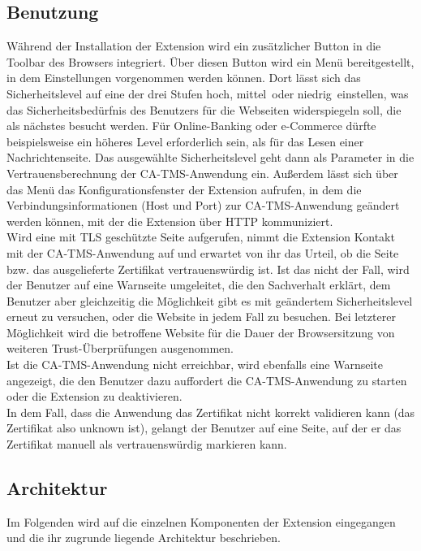 \documentclass[accentcolor=tud1c,article,colorback,11pt]{tudreport}
\begin{document}
\subsection{Benutzung}
Während der Installation der Extension wird ein zusätzlicher Button in die Toolbar des Browsers integriert. Über diesen Button wird ein Menü bereitgestellt, in dem Einstellungen vorgenommen werden können. Dort lässt sich das Sicherheitslevel auf eine der drei Stufen \glqq hoch\grqq, \glqq mittel\grqq ~oder \glqq niedrig\grqq ~einstellen, was das Sicherheitsbedürfnis des Benutzers für die Webseiten widerspiegeln soll, die als nächstes besucht werden. Für Online-Banking oder e-Commerce dürfte beispielsweise ein höheres Level erforderlich sein, als für das Lesen einer Nachrichtenseite. Das ausgewählte Sicherheitslevel geht dann als Parameter in die Vertrauensberechnung der CA-TMS-Anwendung ein. Außerdem lässt sich über das Menü das Konfigurationsfenster der Extension aufrufen, in dem die Verbindungsinformationen (Host und Port) zur CA-TMS-Anwendung geändert werden können, mit der die Extension über HTTP kommuniziert.\\
Wird eine mit TLS geschützte Seite aufgerufen, nimmt die Extension Kontakt mit der CA-TMS-Anwendung auf und erwartet von ihr das Urteil, ob die Seite bzw. das ausgelieferte Zertifikat vertrauenswürdig ist. Ist das nicht der Fall, wird der Benutzer auf eine Warnseite umgeleitet, die den Sachverhalt erklärt, dem Benutzer aber gleichzeitig die Möglichkeit gibt es mit geändertem Sicherheitslevel erneut zu versuchen, oder die Website in jedem Fall zu besuchen. Bei letzterer Möglichkeit wird die betroffene Website für die Dauer der Browsersitzung von weiteren Trust-Überprüfungen ausgenommen.\\
Ist die CA-TMS-Anwendung nicht erreichbar, wird ebenfalls eine Warnseite angezeigt, die den Benutzer dazu auffordert die CA-TMS-Anwendung zu starten oder die Extension zu deaktivieren.\\
In dem Fall, dass die Anwendung das Zertifikat nicht korrekt validieren kann (das Zertifikat also unknown ist), gelangt der Benutzer auf eine Seite, auf der er das Zertifikat manuell als vertrauenswürdig markieren kann.

\subsection{Architektur}
Im Folgenden wird auf die einzelnen Komponenten der Extension eingegangen und die ihr zugrunde liegende Architektur beschrieben.
\end{document}
